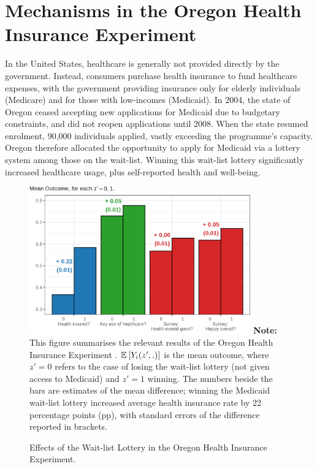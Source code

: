 \section{Mechanisms in the Oregon Health Insurance Experiment}
\label{sec:lottery}
In the United States, healthcare is generally not provided directly by the government.
Instead, consumers purchase health insurance to fund healthcare expenses, with the government providing insurance only for elderly individuals (Medicare) and for those with low-incomes (Medicaid).
In 2004, the state of Oregon ceased accepting new applications for Medicaid due to budgetary constraints, and did not reopen applications until 2008.
When the state resumed enrolment, 90,000 individuals applied, vastly exceeding the programme's capacity.
Oregon therefore allocated the opportunity to apply for Medicaid via a lottery system among those on the wait-list.
Winning this wait-list lottery significantly increased healthcare usage, plus self-reported health and well-being.

\begin{figure}[!htbp]
    \caption{Effects of the Wait-list Lottery in the Oregon Health Insurance Experiment.}
    \centering
    \includegraphics[width=0.85\textwidth]{sections/figures/insurance-effects.png}
    \label{fig:healthinsurance-effects}
    \justify
    \footnotesize    
    \textbf{Note:}
    This figure summarises the relevant results of the Oregon Health Insurance Experiment \citep{finkelstein2008oregon}.
    $\mathbb{E}_{} \left[ Y_i(z',.) \right]$ is the mean outcome, where $z' = 0$ refers to the case of losing the wait-list lottery (not given access to Medicaid) and $z' = 1$ winning.
    The numbers beside the bars are estimates of the mean difference; winning the Medicaid wait-list lottery increased average health insurance rate by 22 percentage points (pp), with standard errors of the difference reported in brackets.
\end{figure}

